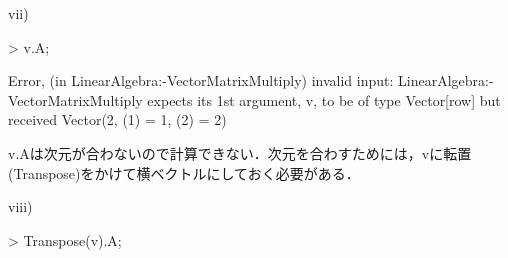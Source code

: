 \begin{enumerate}
\begin{MapleOutputGather}
\left[ \begin {array}{c} 5\\ 11\end {array} \right] \notag
\end{MapleOutputGather}
vii)
\begin{MapleInput}
> v.A;
\end{MapleInput}
\begin{MapleError}
Error, (in LinearAlgebra:-VectorMatrixMultiply) invalid input:
LinearAlgebra:-VectorMatrixMultiply expects its 1st argument, v, to be of type
Vector[row] but received Vector(2, {(1) = 1, (2) = 2})
\end{MapleError}
v.Aは次元が合わないので計算できない．次元を合わすためには，vに転置(Transpose)をかけて横ベクトルにしておく必要がある．

viii)
\begin{MapleInput}
> Transpose(v).A;
\end{MapleInput}
\begin{MapleOutput}
\left[ \begin {array}{cc} 7&10\end {array} \right]
\end{MapleOutput}


\end{enumerate}
